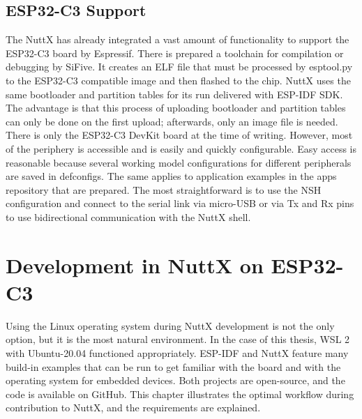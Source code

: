 \documentclass{ctuthesis}
\begin{document}
 \section{ESP32-C3 Support}
 The NuttX has already integrated a vast amount of functionality to support the ESP32-C3 board by Espressif. There is prepared a toolchain for compilation or debugging by SiFive\cite{sifive}. It creates an ELF file that must be processed by esptool.py to the ESP32-C3 compatible image and then flashed to the chip. NuttX uses the same bootloader and partition tables for its run delivered with ESP-IDF SDK. The advantage is that this process of uploading bootloader and partition tables can only be done on the first upload; afterwards, only an image file is needed. There is only the ESP32-C3 DevKit board at the time of writing. However, most of the periphery is accessible and is easily and quickly configurable. Easy access is reasonable because several working model configurations for different peripherals are saved in defconfigs. The same applies to application examples in the apps repository that are prepared. The most straightforward is to use the NSH configuration and connect to the serial link via micro-USB or via Tx and Rx pins to use bidirectional communication with the NuttX shell.
 
\chapter{Development in NuttX on ESP32-C3}
\label{ch:nuttx-on-esp32}
 Using the Linux operating system during NuttX development is not the only option, but it is the most natural environment. In the case of this thesis, WSL 2 with Ubuntu-20.04 functioned appropriately. ESP-IDF and NuttX feature many build-in examples that can be run to get familiar with the board and with the operating system for embedded devices. Both projects are open-source, and the code is available on GitHub. This chapter illustrates the optimal workflow during contribution to NuttX, and the requirements are explained.
\end{document}
